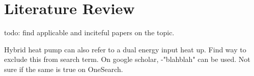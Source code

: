 \chapter{Literature Review}\label{ch:litreview}
todo: find applicable and inciteful papers on the topic. 

Hybrid heat pump can also refer to a dual energy input heat up. Find way to exclude this from search term. On google scholar, -"blahblah" can be used. Not sure if the same is true on OneSearch. 